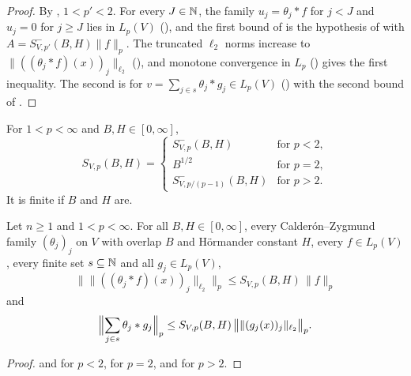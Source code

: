 \begin{proof}
\leanok
By , $1 < p' < 2$. For every $J \in \mathbb{N}$, the family
$u_j = \theta_j * f$ for $j < J$ and $u_j = 0$ for $j \geq J$ lies in $L_p(V)$
(), and the first bound of  is the hypothesis of
 with $A = S^-_{V,p'}(B, H) \|f\|_p$. The truncated $\ell_2$ norms
increase to $\|((\theta_j * f)(x))_j\|_{\ell_2}$ (), and monotone
convergence in $L_p$ () gives the first inequality. The second
is  for
$v = \sum_{j \in s} \theta_j * g_j \in L_p(V)$ () with the second bound of
.
\end{proof}

\begin{definition}
\label{def:cz-const}
\leanok
{}
For $1 < p < \infty$ and $B, H \in [0, \infty]$,
\[
  S_{V,p}(B, H) =
  \begin{cases}
    S^-_{V,p}(B, H) & \text{for } p < 2, \\
    B^{1/2} & \text{for } p = 2, \\
    S^-_{V,p/(p-1)}(B, H) & \text{for } p > 2 .
  \end{cases}
\]
It is finite if $B$ and $H$ are.
\end{definition}

\begin{theorem}
\label{thm:vector-valued-strong-type}
\leanok
{}
Let $n \geq 1$ and $1 < p < \infty$. For all $B, H \in [0, \infty]$, every
Calder\'on--Zygmund family $(\theta_j)_j$ on $V$ with overlap $B$ and H\"ormander constant $H$,
every $f \in L_p(V)$, every finite set $s \subseteq \mathbb{N}$ and all $g_j \in L_p(V)$,
\[
  \bigl\| \|((\theta_j * f)(x))_j\|_{\ell_2} \bigr\|_p \leq S_{V,p}(B, H) \, \|f\|_p
\]
and
\[
  \Bigl\| \sum_{j \in s} \theta_j * g_j \Bigr\|_p
  \leq S_{V,p}(B, H) \, \bigl\| \|(g_j(x))_j\|_{\ell_2} \bigr\|_p .
\]
\end{theorem}

\begin{proof}
\leanok
{} and  for $p < 2$,
 for $p = 2$, and  for $p > 2$.
\end{proof}

